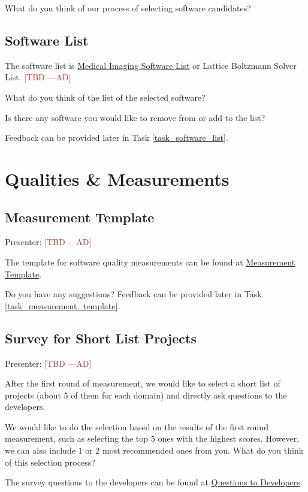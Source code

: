 \documentclass[12pt]{article}
\newcommand{\authornote}[3]{\textcolor{#1}{[#3 ---#2]}}
\newcommand{\authornote}[3]{}
\newcommand{\ad}[1]{\authornote{brown}{AD}{#1}} %
\begin{document}
What do you think of our process of selecting software candidates?

\subsection{Software List}
\label{software_list}
The software list is
\href{https://docs.google.com/spreadsheets/d/122wU0v3ZtvDcqy8C4zKJ89kU-8fXAbo3Mzn6vcVXOi0/edit?usp=sharing}{Medical
Imaging Software List} or Lattice Boltzmann Solver List. \ad{TBD}

What do you think of the list of the selected software?

Is there any software you would like to remove from or add to the list?

Feedback can be provided later in Task \ref{task_software_list}.

\section{Qualities \& Measurements}

\subsection{Measurement Template}
\label{measurement_template}
Presenter: \ad{TBD}

The template for software quality measurements can be found at
\href{https://github.com/smiths/AIMSS/blob/master/StateOfPractice/Combined_MeasurementTemplate_EmpiricalMeasures.xlsx}{Measurement
Template}.

Do you have any suggestions? Feedback can be provided later in Task
\ref{task_measurement_template}.

\subsection{Survey for Short List Projects}
\label{survey_short_list_projects}
Presenter: \ad{TBD}

After the first round of measurement, we would like to select a short list of
projects (about 5 of them for each domain) and directly ask questions to the
developers.

We would like to do the selection based on the results of the first round
measurement, such as selecting the top 5 ones with the highest scores. However, we
can also include 1 or 2 most recommended ones from you. What do you think of
this selection process?

The survey questions to the developers can be found at
\href{https://github.com/smiths/AIMSS/blob/master/StateOfPractice/Ao-Notes/Questions%20to%20Developers.pdf}{Questions
to Developers}.
\end{document}
